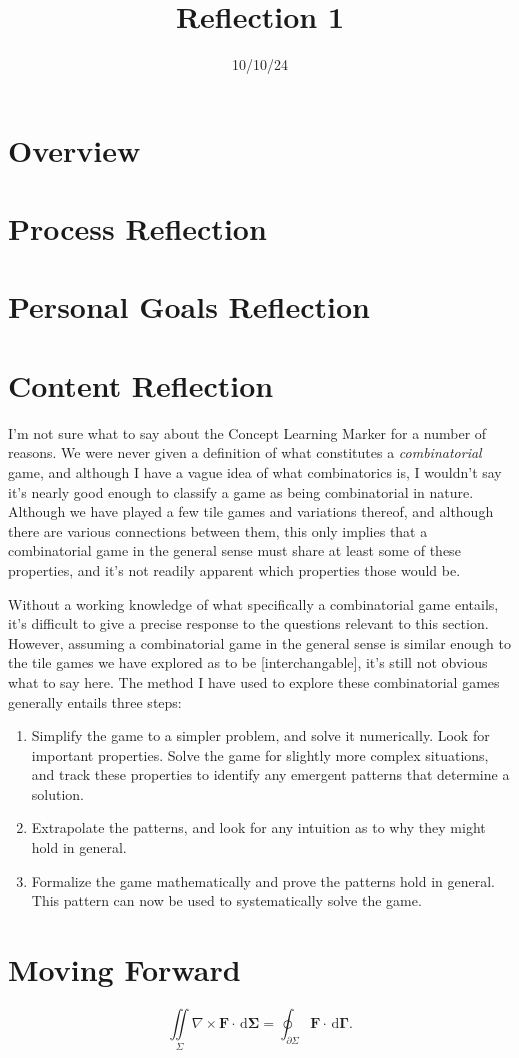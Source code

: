 \documentclass[11pt, letterpaper]{report}
\title{Reflection 1}
\date{10/10/24}
\begin{document}
\makeproblem
\section{Overview}
\section{Process Reflection}
\section{Personal Goals Reflection}
\section{Content Reflection}
I'm not sure what to say about the Concept Learning Marker for a number of reasons. We were never given a definition of what constitutes a \emph{combinatorial} game, and although I have a vague idea of what combinatorics is, I wouldn't say it's nearly good enough to classify a game as being combinatorial in nature. Although we have played a few tile games and variations thereof, and although there are various connections between them, this only implies that a combinatorial game in the general sense must share at least some of these properties, and it's not readily apparent which properties those would be.

Without a working knowledge of what specifically a combinatorial game entails, it's difficult to give a precise response to the questions relevant to this section. However, assuming a combinatorial game in the general sense is similar enough to the tile games we have explored as to be [interchangable], it's still not obvious what to say here. The method I have used to explore these combinatorial games generally entails three steps:
\begin{enumerate}
	\item Simplify the game to a simpler problem, and solve it numerically. Look for important properties. Solve the game for slightly more complex situations, and track these properties to identify any emergent patterns that determine a solution.
	\item Extrapolate the patterns, and look for any intuition as to why they might hold in general.
	\item Formalize the game mathematically and prove the patterns hold in general. This pattern can now be used to systematically solve the game.
\end{enumerate}

\section{Moving Forward}
\[
	\iint\limits_{\Sigma } \nabla \times \mathbf{F} \cdot  \,\mathrm{d} \boldsymbol{\Sigma} =\oint_{\partial \Sigma } \mathbf{F}\cdot  \,\mathrm{d} \boldsymbol{\Gamma} 
.\]
\end{document}
